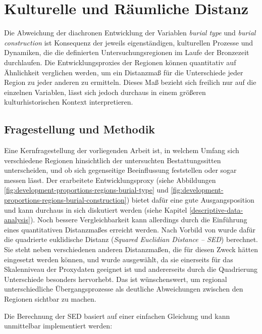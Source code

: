 \documentclass[openany,twoside,twocolumn]{book}
\begin{document}
\hypertarget{cultural-and-spatial-distance}{%
\section{Kulturelle und Räumliche Distanz}\label{cultural-and-spatial-distance}}

Die Abweichung der diachronen Entwicklung der Variablen \emph{burial type} und \emph{burial construction} ist Konsequenz der jeweils eigenständigen, kulturellen Prozesse und Dynamiken, die die definierten Untersuchungsregionen im Laufe der Bronzezeit durchlaufen. Die Entwicklungsproxies der Regionen können quantitativ auf Ähnlichkeit verglichen werden, um ein Distanzmaß für die Unterschiede jeder Region zu jeder anderen zu ermitteln. Dieses Maß bezieht sich freilich nur auf die einzelnen Variablen, lässt sich jedoch durchaus in einem größeren kulturhistorischen Kontext interpretieren.

\hypertarget{fragestellung-und-methodik}{%
\subsection{Fragestellung und Methodik}\label{fragestellung-und-methodik}}

Eine Kernfragestellung der vorliegenden Arbeit ist, in welchem Umfang sich verschiedene Regionen hinsichtlich der untersuchten Bestattungssitten unterscheiden, und ob sich gegenseitige Beeinflussung feststellen oder sogar messen lässt. Der erarbeitete Entwicklungsproxy (siehe Abbildungen \ref{fig:development-proportions-regions-burial-type} und \ref{fig:development-proportions-regions-burial-construction}) bietet dafür eine gute Ausgangsposition und kann durchaus in sich diskutiert werden (siehe Kapitel \ref{descriptive-data-analysis}). Noch bessere Vergleichbarkeit kann allerdings durch die Einführung eines quantitativen Distanzmaßes erreicht werden. Nach Vorbild von \textcite{neiman_stylistic_1995} wurde dafür die quadrierte euklidische Distanz (\emph{Squared Euclidian Distance -- SED}) berechnet. Sie steht neben verschiedenen anderen Distanzmaßen, die für diesen Zweck hätten eingesetzt werden können, und wurde ausgewählt, da sie einerseits für das Skalenniveau der Proxydaten geeignet ist und andererseits durch die Quadrierung Unterschiede besonders hervorhebt. Das ist wünschenswert, um regional unterschiedliche Übergangsprozesse als deutliche Abweichungen zwischen den Regionen sichtbar zu machen.

Die Berechnung der SED basiert auf einer einfachen Gleichung und kann unmittelbar implementiert werden:
\end{document}
